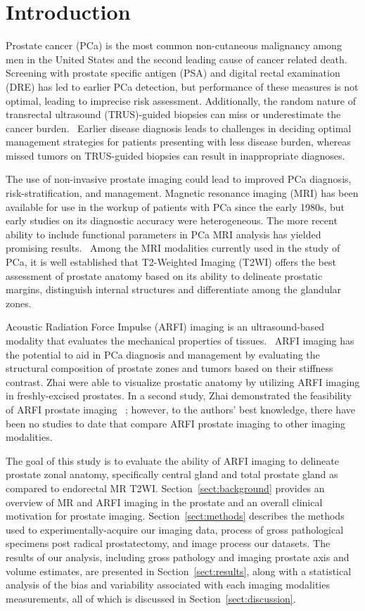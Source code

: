 \section{Introduction}\label{sect:intro}
Prostate cancer (PCa) is the most common non-cutaneous malignancy among men in
the United States and the second leading cause of cancer related
death.~\cite{Howlader2011} Screening with prostate specific antigen (PSA) and
digital rectal examination (DRE) has led to earlier PCa detection, but
performance of these measures is not optimal, leading to imprecise risk
assessment.  Additionally, the random nature of transrectal ultrasound
(TRUS)-guided biopsies can miss or underestimate the cancer
burden.~\cite{Gupta2013} Earlier disease diagnosis leads to challenges in
deciding optimal management strategies for patients presenting with less
disease burden, whereas missed tumors on TRUS-guided biopsies can result in
inappropriate diagnoses. 

The use of non-invasive prostate imaging could lead to improved PCa diagnosis,
risk-stratification, and management.  Magnetic resonance imaging (MRI) has been
available for use in the workup of patients with PCa since the early 1980s, but
early studies on its diagnostic accuracy were heterogeneous.  The more
recent ability to include functional parameters in PCa MRI analysis has yielded
promising results.~\cite{Gupta2013,Hricak2007} Among the MRI modalities
currently used in the study of PCa, it is well established that T2-Weighted
Imaging (T2WI) offers the best assessment of prostate anatomy based on its
ability to delineate prostatic margins, distinguish internal structures and
differentiate among the glandular zones. 

Acoustic Radiation Force Impulse (ARFI) imaging is an ultrasound-based modality
that evaluates the mechanical properties of tissues.~\cite{Nightingale2002b}
ARFI imaging has the potential to aid in PCa diagnosis and management by
evaluating the structural composition of prostate zones and tumors based on
their stiffness contrast.  Zhai \etal were able to visualize prostatic anatomy
by utilizing ARFI imaging in freshly-excised prostates. In a second study, Zhai
\etal demonstrated the feasibility of ARFI prostate imaging
\invivo~\cite{Zhai2012}; however, to the authors’ best knowledge, there have
been no studies to date that compare \invivo ARFI prostate imaging to other
imaging modalities.~\cite{Zhai2010} 

The goal of this study is to evaluate the ability of ARFI imaging to delineate
prostate zonal anatomy, specifically central gland and total prostate gland
\invivo as compared to endorectal MR T2WI.  Section~\ref{sect:background}
provides an overview of MR and ARFI imaging in the prostate and an overall
clinical motivation for prostate imaging.  Section~\ref{sect:methods} describes
the methods used to experimentally-acquire our imaging data, process of gross
pathological specimens post radical prostatectomy, and image process our
datasets.  The results of our analysis, including gross pathology and imaging
prostate axis and volume estimates, are presented in
Section~\ref{sect:results}, along with a statistical analysis of the bias and
variability associated with each imaging modalities measurements, all of which
is discussed in Section~\ref{sect:discussion}.
